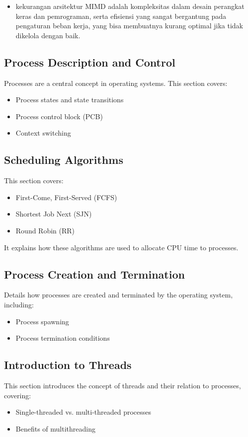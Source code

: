 \documentclass[12pt]{article}
\begin{document}
\begin{enumerate}
\begin{itemize}
        \item kekurangan arsitektur MIMD adalah kompleksitas dalam desain perangkat keras dan pemrograman, serta efisiensi yang sangat bergantung pada pengaturan beban kerja, yang bisa membuatnya kurang optimal jika tidak dikelola dengan baik.
    \end{itemize}
    

\end{enumerate}


\subsection{Process Description and Control}
Processes are a central concept in operating systems. This section covers:
\begin{itemize}
    \item Process states and state transitions
    \item Process control block (PCB)
    \item Context switching
\end{itemize}

\subsection{Scheduling Algorithms}
This section covers:
\begin{itemize}
    \item First-Come, First-Served (FCFS)
    \item Shortest Job Next (SJN)
    \item Round Robin (RR)
\end{itemize}
It explains how these algorithms are used to allocate CPU time to processes.

\subsection{Process Creation and Termination}
Details how processes are created and terminated by the operating system, including:
\begin{itemize}
    \item Process spawning
    \item Process termination conditions
\end{itemize}

\subsection{Introduction to Threads}
This section introduces the concept of threads and their relation to processes, covering:
\begin{itemize}
    \item Single-threaded vs. multi-threaded processes
    \item Benefits of multithreading
\end{itemize}
\end{document}
